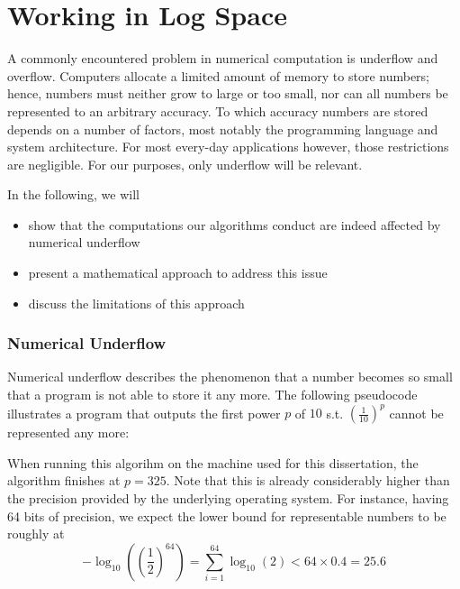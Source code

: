 \section{Working in Log Space}

A commonly encountered problem in numerical computation is underflow and overflow. Computers allocate a limited amount of memory to store numbers; hence, numbers must neither grow to large or too small, nor can all numbers be represented to an arbitrary accuracy. To which accuracy numbers are stored depends on a number of factors, most notably the programming language and system architecture. For most every-day applications however, those restrictions are negligible. For our purposes, only underflow will be relevant. 

In the following, we will 
\begin{itemize}
	\item show that the computations our algorithms conduct are indeed affected by numerical underflow
	\item present a mathematical approach to address this issue
	\item discuss the limitations of this approach
\end{itemize}


\subsubsection*{Numerical Underflow}
Numerical underflow describes the phenomenon that a number becomes so small that a program is not able to store it any more. The following pseudocode illustrates a program that outputs the first power $p$ of $10$ s.t. $\left(\frac{1}{10}\right)^p$ cannot be represented any more:


When running this algorihm on the machine used for this dissertation, the algorithm finishes at $p=325$. Note that this is already considerably higher than the precision provided by the underlying operating system. For instance, having 64 bits of precision, we expect the lower bound for representable numbers to be roughly at 
\[
- \log_{10}\left(
	\left(\frac{1}{2}\right)^{64}
\right) = 
\sum_{i=1}^{64} \log_{10} \left(2\right)
< 64 \times  0.4 =  25.6
\]



